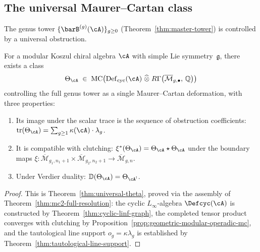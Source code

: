 \subsection{The universal Maurer--Cartan class}

The genus tower $\{\barB^{(g)}(\cA)\}_{g \geq 0}$
(Theorem~\ref{thm:master-tower}) is controlled by a universal
obstruction.

\begin{theorem}\label{thm:universal-MC}
For a modular Koszul chiral algebra $\cA$ with simple Lie
symmetry~$\mathfrak{g}$, there exists a class
\[
\Theta_{\cA} \;\in\;
\operatorname{MC}\!\left(
  \operatorname{Def}_{\mathrm{cyc}}(\cA)
  \;\widehat{\otimes}\;
  R\Gamma\!\left(\overline{\mathcal{M}}_{g,\bullet},\, \mathbb{Q}\right)
\right)
\]
controlling the full genus tower as a single Maurer--Cartan deformation,
with three properties:
\begin{enumerate}[label=\textup{(\roman*)}]
\item Its image under the scalar trace is the sequence of obstruction
  coefficients: $\operatorname{tr}(\Theta_{\cA})
  = \sum_{g \geq 1} \kappa(\cA) \cdot \lambda_g$.
\item It is compatible with clutching:
  $\xi^*(\Theta_{\cA})
  = \Theta_{\cA} \star \Theta_{\cA}$
  under the boundary maps
  $\xi \colon \overline{\mathcal{M}}_{g_1,n_1+1} \times
  \overline{\mathcal{M}}_{g_2,n_2+1} \to
  \overline{\mathcal{M}}_{g,n}$.
\item Under Verdier duality:
  $\mathbb{D}(\Theta_{\cA}) = \Theta_{\cA^!}$.
\end{enumerate}
\end{theorem}

\begin{proof}
This is Theorem~\ref{thm:universal-theta}, proved via the
assembly of Theorem~\ref{thm:mc2-full-resolution}: the cyclic
$L_\infty$-algebra $\Defcyc(\cA)$ is constructed by
Theorem~\ref{thm:cyclic-linf-graph}, the completed tensor product
converges with clutching by
Proposition~\ref{prop:geometric-modular-operadic-mc}, and the
tautological line support $o_g = \kappa \lambda_g$ is established
by Theorem~\ref{thm:tautological-line-support}.
\end{proof}

